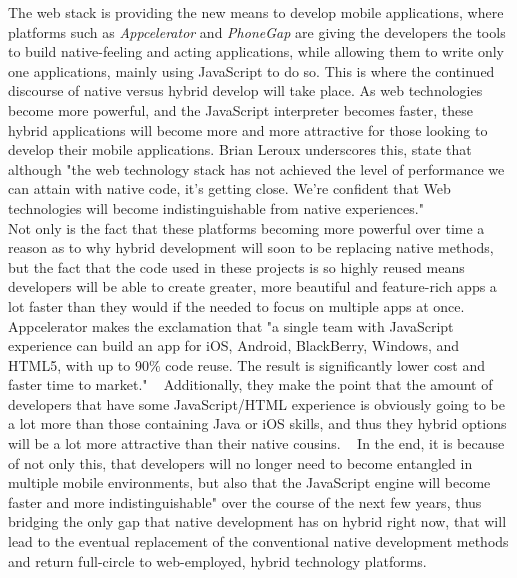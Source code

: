 \documentclass[11pt, twocolumn]{article}
\begin{document}
The web stack is providing the new means to develop mobile applications, where platforms such as {\it Appcelerator} and {\it PhoneGap} are giving the developers the tools to build native-feeling and acting applications, while allowing them to write only one applications, mainly using JavaScript to do so.  This is where the continued discourse of native versus hybrid develop will take place.  As web technologies become more powerful, and the JavaScript interpreter becomes faster, these hybrid applications will become more and more attractive for those looking to develop their mobile applications.  Brian Leroux underscores this, state that although "the web technology stack has not achieved the level of performance we can attain with native code, it's getting close.  We're confident that Web technologies will become indistinguishable from native experiences." ~\cite{Leroux2011}\\

Not only is the fact that these platforms becoming more powerful over time a reason as to why hybrid development will soon to be replacing native methods, but the fact that the code used in these projects is so highly reused means developers will be able to create greater, more beautiful and feature-rich apps a lot faster than they would if the needed to focus on multiple apps at once.  Appcelerator makes the exclamation that "a single team with JavaScript experience can build an app for iOS, Android, BlackBerry, Windows, and HTML5, with up to 90\% code reuse.  The result is significantly lower cost and faster time to market."  ~\cite{Appcelerator.com2012}  Additionally, they make the point that the amount of developers that have some JavaScript/HTML experience is obviously going to be a lot more than those containing Java or iOS skills, and thus they hybrid options will be a lot more attractive than their native cousins. ~\cite{Appcelerator.com2012} In the end, it is because of not only this, that developers will no longer need to become entangled in multiple mobile environments, but also that the JavaScript engine will become faster and more indistinguishable" over the course of the next few years, thus bridging the only gap that native development has on hybrid right now, that will lead to the eventual replacement of the conventional native development methods and return full-circle to web-employed, hybrid technology platforms. ~\cite{Leroux2011}
\end{document}

